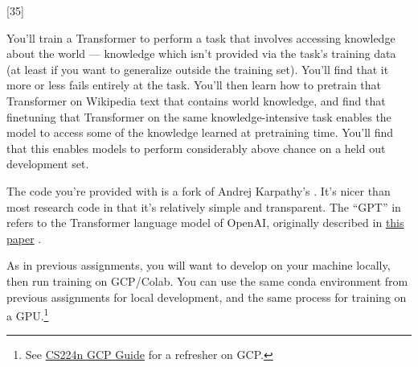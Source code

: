 \graphicspath{ {images/} }

\newcommand{\Real}{\mathbb{R}}
\newcommand{\Int}{\mathbb{Z}}
\renewcommand\Re{\ensuremath{\text{Re}}} %


\newcommand{\henc}{\bh^{\text{enc}}}
\newcommand{\hencfw}[1]{\overrightarrow{\henc_{#1}}}
\newcommand{\hencbw}[1]{\overleftarrow{\henc_{#1}}}

\newcommand{\cenc}{\bc^{\text{enc}}}
\newcommand{\cencfw}[1]{\overrightarrow{\cenc_{#1}}}
\newcommand{\cencbw}[1]{\overleftarrow{\cenc_{#1}}}

\newcommand{\hdec}{\bh^{\text{dec}}}

\newcommand{\cdec}{\bc^{\text{dec}}}

\lstset{basicstyle=\ttfamily,columns=flexible,numbers=none}

[35]
\label{sec:char_enc}

You'll train a Transformer to perform a task that involves accessing knowledge about the world --- knowledge which isn't provided via the task's training data (at least if you want to generalize outside the training set). You'll find that it more or less fails entirely at the task.
You'll then learn how to pretrain that Transformer on Wikipedia text that contains world knowledge, and find that finetuning that Transformer on the same knowledge-intensive task enables the model to access some of the knowledge learned at pretraining time.
You'll find that this enables models to perform considerably above chance on a held out development set.

The code you're provided with is a fork of Andrej Karpathy's \href{https://github.com/karpathy/minGPT}{\mingpt}.
It's nicer than most research code in that it's relatively simple and transparent.
The ``GPT'' in \mingpt refers to the Transformer language model of OpenAI, originally described in \href{https://s3-us-west-2.amazonaws.com/openai-assets/research-covers/language-unsupervised/language_understanding_paper.pdf}{this paper} \cite{radford2018improving}.

As in previous assignments, you will want to develop on your machine locally, then run training on GCP/Colab. You can use the same conda environment from previous assignments for local development, and the same process for training on a GPU.\footnote{See \href{https://docs.google.com/document/d/1FLx0CXIn-SoExxKM1efC-E-6iBjUR4uEnpGnfemMMR0}{CS224n GCP Guide} for a refresher on GCP.}

